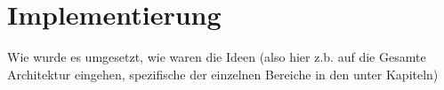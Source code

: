 \chapter{Implementierung}

Wie wurde es umgesetzt, wie waren die Ideen (also hier z.b. auf die Gesamte Architektur eingehen, spezifische der einzelnen Bereiche in den unter Kapiteln)





  

 
 
 
 
 
 
 
 